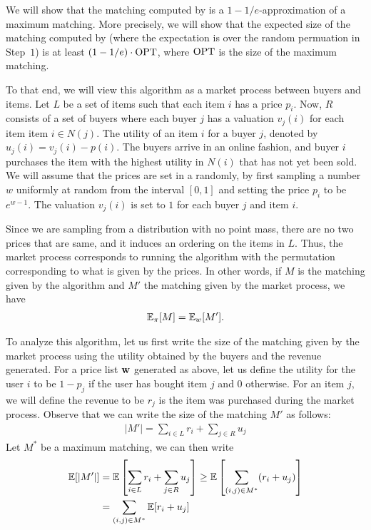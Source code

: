 We will show that the matching computed by \ranking is a $1-1/e$-approximation of a maximum matching. More precisely, we will show that the expected size of the matching computed by \ranking (where the expectation is over the random permuation in Step~$1$) is at least $(1-1/e)\cdot \operatorname{OPT}$, where $\operatorname{OPT}$ is the size of the maximum matching.

To that end, we will view this algorithm as a market process between buyers and items. Let $L$ be a set of items such that each item $i$ has a price $p_i$. Now, $R$ consists of a set of buyers where each buyer $j$ has a valuation $v_j(i)$ for each item item $i \in N(j)$. The utility of an item $i$ for a buyer $j$, denoted by $u_j(i) = v_j(i) - p(i)$. The buyers arrive in an online fashion, and buyer $i$ purchases the item with the highest utility in $N(i)$ that has not yet been sold. We will assume that the prices are set in a randomly, by first sampling a number $w$ uniformly at random from the interval $[0,1]$ and setting the price $p_i$ to be $e^{w-1}$. The valuation $v_j(i)$ is set to $1$ for each buyer $j$ and item $i$. 

Since we are sampling from a distribution with no point mass, there are no two prices that are same, and it induces an ordering on the items in $L$. Thus, the market process corresponds to running the \ranking algorithm with the permutation corresponding to what is given by the prices. In other words, if $M$ is the matching given by the \ranking algorithm and $M'$ the matching given by the market process, we have
\begin{align*}
	\mathbb{E}_\pi [M] = \mathbb{E}_w[M'].
\end{align*}

To analyze this algorithm, let us first write the size of the matching given by the market process using the utility obtained by the buyers and the revenue generated. For a price list $\mathbf{w}$ generated as above, let us define the utility for the user $i$ to be $1 - p_j$ if the user has bought item $j$ and $0$ otherwise. For an item $j$, we will define the revenue to be $r_j$ is the item was purchased during the market process. Observe that we can write the size of the matching $M'$ as follows:
\begin{align*}
	|M'| = \sum_{i\in L} r_i + \sum_{j\in R} u_j
\end{align*}
Let $M^*$ be a maximum matching, we can then write
\begin{align*}
	\mathbb{E}[|M'|] &= \mathbb{E}\left[\sum_{i\in L} r_i + \sum_{j\in R} u_j \right] \geq \mathbb{E}\left[ \sum_{(i,j)\in M^*} (r_i + u_j) \right]\\
	&= \sum_{(i,j)\in M^*} \mathbb{E}[r_i + u_j]
\end{align*}


